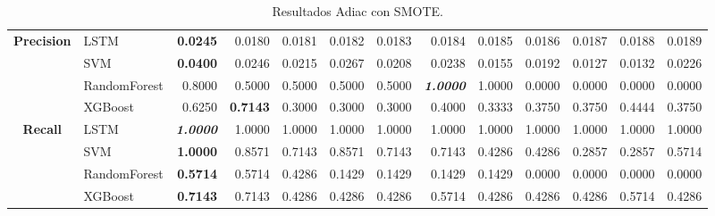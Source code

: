 \begin{table}[H]
\begin{adjustbox}{max width=12cm}
\begin{tabular}{|c|l|r|r|r|r|r|r|r|r|r|r|r|}
			\hline
			\textbf{Precision} &  LSTM & \textbf{  0.0245 } &  0.0180 &  0.0181 &  0.0182 &  0.0183 &  0.0184 &  0.0185 &  0.0186 &  0.0187 &  0.0188 &  0.0189 \\
			&  SVM & \textbf{  0.0400 } &  0.0246 &  0.0215 &  0.0267 &  0.0208 &  0.0238 &  0.0155 &  0.0192 &  0.0127 &  0.0132 &  0.0226 \\
			&  RandomForest &  0.8000 &  0.5000 &  0.5000 &  0.5000 &  0.5000 & \textit{ \textbf{  1.0000 } } &  1.0000 &  0.0000 &  0.0000 &  0.0000 &  0.0000 \\
			&  XGBoost &  0.6250 & \textbf{  0.7143 } &  0.3000 &  0.3000 &  0.3000 &  0.4000 &  0.3333 &  0.3750 &  0.3750 &  0.4444 &  0.3750 \\
			\hline
			\textbf{Recall} &  LSTM & \textit{ \textbf{  1.0000 } } &  1.0000 &  1.0000 &  1.0000 &  1.0000 &  1.0000 &  1.0000 &  1.0000 &  1.0000 &  1.0000 &  1.0000 \\
			&  SVM & \textbf{  1.0000 } &  0.8571 &  0.7143 &  0.8571 &  0.7143 &  0.7143 &  0.4286 &  0.4286 &  0.2857 &  0.2857 &  0.5714 \\
			&  RandomForest & \textbf{  0.5714 } &  0.5714 &  0.4286 &  0.1429 &  0.1429 &  0.1429 &  0.1429 &  0.0000 &  0.0000 &  0.0000 &  0.0000 \\
			&  XGBoost & \textbf{  0.7143 } &  0.7143 &  0.4286 &  0.4286 &  0.4286 &  0.5714 &  0.4286 &  0.4286 &  0.4286 &  0.5714 &  0.4286 \\
			\hline
		\end{tabular}
	\end{adjustbox}
	\caption{Resultados Adiac con SMOTE.}
	\label{tab:Adiac_SMOTE}
\end{table}
